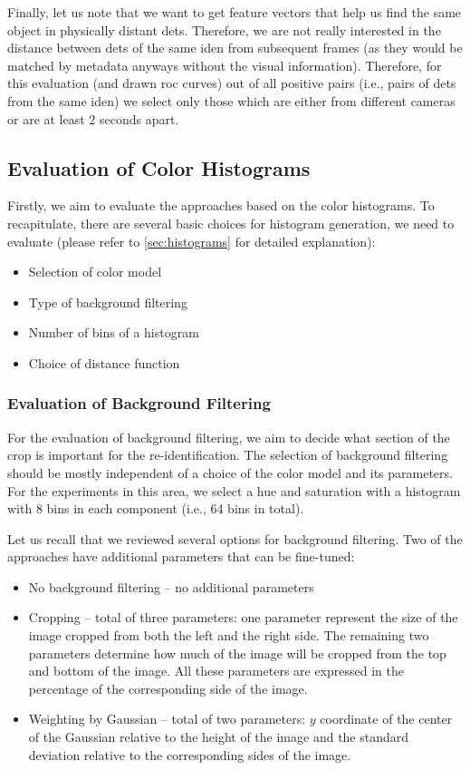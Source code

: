Finally, let us note that we want to get feature vectors that help us find the same object in physically distant \glspl{det}. Therefore, we are not really interested in the distance between \glspl{det} of the same \gls{iden} from subsequent frames (as they would be matched by metadata anyways without the visual information). Therefore, for this evaluation (and drawn \gls{roc} curves) out of all positive pairs (i.e., pairs of \glspl{det} from the same \gls{iden}) we select only those which are either from different cameras or are at least 2 seconds apart.

\subsection{Evaluation of Color Histograms}

Firstly, we aim to evaluate the approaches based on the color histograms. To recapitulate, there are several basic choices
for histogram generation, we need to evaluate (please refer to
\autoref{sec:histograms} for detailed explanation):

\begin{itemize}
    \item Selection of color model
    \item Type of background filtering
    \item Number of bins of a histogram
    \item Choice of distance function
\end{itemize}

\subsubsection{Evaluation of Background Filtering}

For the evaluation of background filtering, we
aim to decide what section of the crop is important for the re-identification. The selection of background filtering should be mostly independent of
a choice of the color model and its parameters. For the experiments in this
area, we select a hue and saturation with a histogram with 8 bins in
each component (i.e., 64 bins in total).

Let us recall that we reviewed several options for background filtering. Two of the approaches have additional parameters that can be fine-tuned:

\begin{itemize}
    \item No background filtering -- no additional parameters
    \item Cropping -- total of three parameters: one parameter represent the size of the image cropped from both the left and the right side. The remaining two parameters determine how much of the image will be cropped from the top and bottom of the image. All these parameters are expressed in the percentage of the corresponding side of the image.
    \item Weighting by Gaussian -- total of two parameters: $y$ coordinate of the center of the Gaussian relative to the height of the image and the standard deviation relative to the corresponding sides of the image.
\end{itemize}

